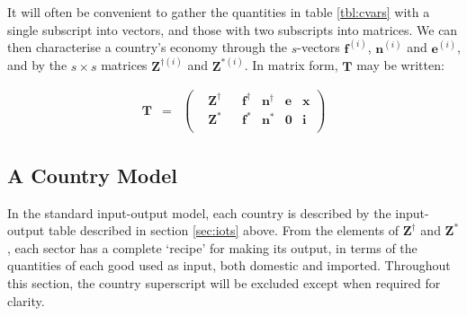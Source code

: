 \documentclass[a4paper]{article}
\begin{document}
\noindent It will often be convenient to gather the quantities in table \ref{tbl:cvars} with a single subscript into vectors, and those with two subscripts into matrices. 
We can then characterise a country's economy through the $s$-vectors $\boldsymbol{f}^{(i)}$, $\boldsymbol{n}^{(i)}$ and $\boldsymbol{e}^{(i)}$, and by the $s\times s$ matrices $\boldsymbol{Z}^{\dagger(i)}$ and $\boldsymbol{Z}^{*(i)}$.
In matrix form, $\boldsymbol{T}$ may be written:

\begin{equation}\label{eqn:Tvectorised}
\begin{array}{rcc}
\boldsymbol{T} & = & 
\left(
	\begin{array}{ccccccc}
 & \boldsymbol{Z}^{\dag} & & \boldsymbol{f}^\dag & \boldsymbol{n}^\dag & \boldsymbol{e} & \boldsymbol{x} \\
 & \boldsymbol{Z}^* & & \boldsymbol{f}^* & \boldsymbol{n}^* & \boldsymbol{0} & \boldsymbol{i} \\
	\end{array} 
\right)
\end{array}
\end{equation}

\subsection{A Country Model}\label{sec:countries}
In the standard input-output model, each country is described by the input-output table described in section \ref{sec:iots} above.
From the elements of $\boldsymbol{Z}^\dagger$ and $\boldsymbol{Z}^*$, each sector has a complete `recipe' for making its output, in terms of the quantities of each good used as input, both domestic and imported. Throughout this section, the country superscript will be excluded except when required for clarity.
\end{document}
